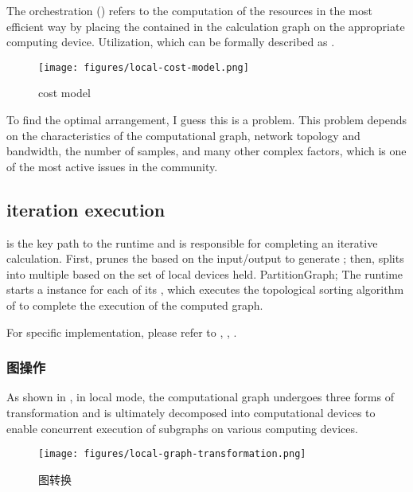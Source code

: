 \begin{content}
The  orchestration () refers to the computation of the resources in the most efficient way by placing the  contained in the calculation graph on the appropriate computing device. Utilization, which can be formally described as .

\begin{figure}[H]
\centering
\texttt{[image: figures/local-cost-model.png]}
\caption{cost model}
 \label{fig:local-cost-model}
\end{figure}

To find the optimal arrangement, I guess this is a  problem. This problem depends on the characteristics of the computational graph, network topology and bandwidth, the number of samples, and many other complex factors, which is one of the most active issues in the community.

\subsection{iteration execution}

 is the key path to the \tf{} runtime and is responsible for completing an iterative calculation. First,  prunes the  based on the input/output to generate ; then, splits  into multiple \codes based on the set of local devices held. {PartitionGraph}; The runtime starts a  instance for each of its , which executes the topological sorting algorithm of  to complete the execution of the computed graph.

For specific implementation, please refer to , , .

\subsubsection{图操作}

As shown in , in local mode, the computational graph undergoes three forms of transformation and is ultimately decomposed into computational devices to enable concurrent execution of subgraphs on various computing devices.

\begin{figure}[H]
\centering
\texttt{[image: figures/local-graph-transformation.png]}
\caption{图转换}
 \label{fig:local-graph-transformation}
\end{figure}


\end{content}
